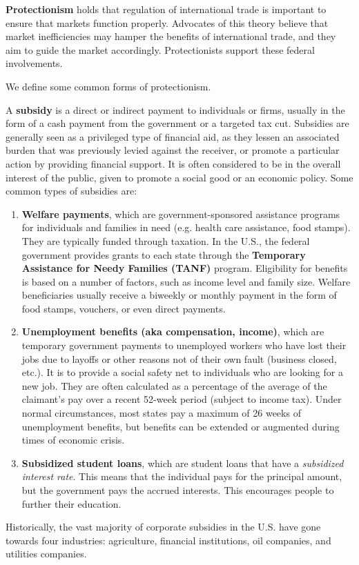 \documentclass{article}
\begin{document}
  \begin{definition}[Protectionism]
    \textbf{Protectionism} holds that regulation of international trade is important to ensure that markets function properly. Advocates of this theory believe that market inefficiencies may hamper the benefits of international trade, and they aim to guide the market accordingly. Protectionists support these federal involvements. 
  \end{definition}

  We define some common forms of protectionism. 

  \begin{definition}[Subsidies]
    A \textbf{subsidy} is a direct or indirect payment to individuals or firms, usually in the form of a cash payment from the government or a targeted tax cut. Subsidies are generally seen as a privileged type of financial aid, as they lessen an associated burden that was previously levied against the receiver, or promote a particular action by providing financial support. It is often considered to be in the overall interest of the public, given to promote a social good or an economic policy. Some common types of subsidies are: 
    \begin{enumerate}
      \item \textbf{Welfare payments}, which are government-sponsored assistance programs for individuals and families in need (e.g. health care assistance, food stamps). They are typically funded through taxation. In the U.S., the federal government provides grants to each state through the \textbf{Temporary Assistance for Needy Families (TANF)} program. Eligibility for benefits is based on a number of factors, such as income level and family size. Welfare beneficiaries usually receive a biweekly or monthly payment in the form of food stamps, vouchers, or even direct payments. 
      \item \textbf{Unemployment benefits (aka compensation, income)}, which are temporary government payments to unemployed workers who have lost their jobs due to layoffs or other reasons not of their own fault (business closed, etc.). It is to provide a social safety net to individuals who are looking for a new job. They are often calculated as a percentage of the average of the claimant's pay over a recent 52-week period (subject to income tax). Under normal circumstances, most states pay a maximum of 26 weeks of unemployment benefits, but benefits can be extended or augmented during times of economic crisis. 
      \item \textbf{Subsidized student loans}, which are student loans that have a \textit{subsidized interest rate}. This means that the individual pays for the principal amount, but the government pays the accrued interests. This encourages people to further their education. 
    \end{enumerate}
    Historically, the vast majority of corporate subsidies in the U.S. have gone towards four industries: agriculture, financial institutions, oil companies, and utilities companies. 
  \end{definition}
\end{document}
